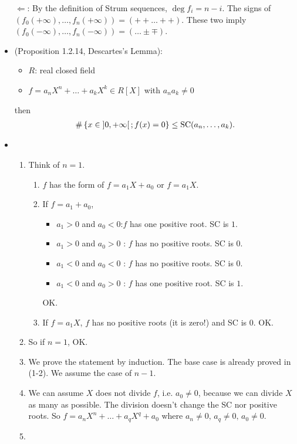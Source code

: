 \documentclass[9pt]{ltjsarticle}
\begin{document}
\begin{itemize}
  $\Leftarrow$:
  By the definition of Strum sequences,
  $\deg f_i = n - i$.  The signs of
  $(f_0(+\infty),\dots,f_n(+\infty)) = (++\dots ++)$.
  These two imply $(f_0(-\infty),\dots,f_n(-\infty)) = (\dots \pm \mp)$.
  \item
  (Proposition 1.2.14, Descartes's Lemma):
  \begin{itemize}
    \item $R$: real closed field
    \item $f=a_n X^n + \dots + a_k X^k \in R[X]$ with $a_n a_k \neq 0$
  \end{itemize}
  then
  \begin{align}
    \# \left\{x \in \left] 0,+\infty \right[; f(x)=0\right\} \le \mathrm{SC}(a_n,\dots,a_k).
  \end{align}
  \item
  \pf
  \begin{enumerate}
    \item
    Think of $n=1$.
    \begin{enumerate}
      \item  $f$ has the form of
      $f=a_1X + a_0$ or $f=a_1X$.
      \item If $f=a_1 + a_0$,
      \begin{itemize}
        \item $a_1 > 0$ and $a_0 < 0$:$f$ has one positive root.  SC is $1$.
        \item $a_1 >0 $ and $a_0 > 0$ : $f$ has no positive roots.  SC is $0$.
        \item $a_1 < 0$ and $a_0 < 0$ : $f$ has no positive roots.  SC is $0$.
        \item $a_1 < 0$ and $a_0 > 0$ : $f$ has one positive root.  SC is $1$.
      \end{itemize}
      OK.
      \item
      If $f=a_1 X$,
      $f$ has no positive roots (it is zero!) and
      SC is $0$.  OK.
    \end{enumerate}
    \item
    So if $n=1$, OK.
    \item We prove the statement by induction.  The base case is already proved in (1-2).
    We assume the case of $n-1$.
    \item
    We can assume $X$ does not divide $f$, i.e. $a_0 \neq 0$,
    because we can divide $X$ as many as possible.
    The division doesn't change the SC nor positive roots.
    So $f=a_n X^n + \dots + a_q X^q + a_0$ where
    $a_n \neq 0,\, a_q \neq 0,\, a_0 \neq 0$.
    \item

\end{enumerate}
\end{itemize}
\end{document}
